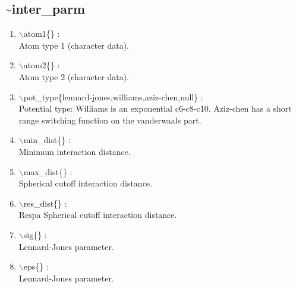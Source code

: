 \documentclass[12pt]{article}
\begin{document}

\newpage
\subsection*{\bf \~{}inter\_parm}

\begin{enumerate}

 \vspace{0.15in} 
 \item  $\backslash$atom1\{\} : \\ 
    Atom type 1 (character data).

 \vspace{0.15in} 
 \item  $\backslash$atom2\{\} : \\ 
    Atom type 2 (character data).

 \vspace{0.15in} 
 \item  $\backslash$pot\_type\{lennard-jones,williams,aziz-chen,null\} : \\ 
    Potential type: Williams is an exponential c6-c8-c10. Aziz-chen has
    a short range switching function on the vanderwaals part.

 \vspace{0.15in} 
 \item  $\backslash$min\_dist\{\} : \\ 
    Minimum interaction distance.

 \vspace{0.15in} 
 \item  $\backslash$max\_dist\{\} : \\ 
    Spherical cutoff interaction distance.

 \vspace{0.15in} 
 \item  $\backslash$res\_dist\{\} : \\ 
    Respa Spherical cutoff interaction distance.

 \vspace{0.15in} 
 \item  $\backslash$sig\{\} : \\ 
    Lennard-Jones parameter.

 \vspace{0.15in} 
 \item  $\backslash$eps\{\} : \\ 
    Lennard-Jones parameter.


\end{enumerate}
\end{document}

